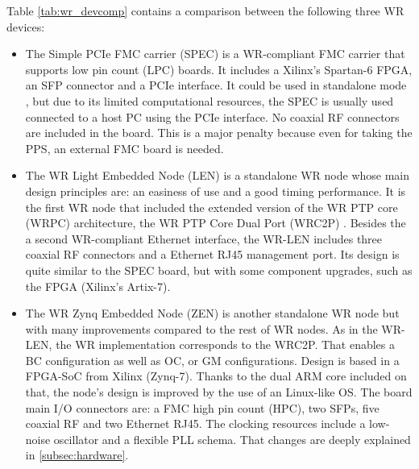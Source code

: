 Table \ref{tab:wr_devcomp} contains a comparison between the following three WR 
devices: 
\begin{itemize}
	\item The Simple PCIe FMC carrier (SPEC) \cite{ohwr:spec} is a WR-compliant 
	FMC carrier that supports low pin count (LPC) boards. It includes a 
	Xilinx's Spartan-6 FPGA, an SFP connector and a PCIe interface. It could be 
	used in standalone mode \cite{migueljl-paper-wr-spec}, but due to its 
	limited computational resources, the SPEC is usually used connected to a 
	host PC using the PCIe interface. 
	No coaxial RF connectors are included in the board. This is a major penalty 
	because even for taking the PPS, an external FMC board is needed.
	
	\item The WR Light Embedded Node (LEN) \cite{sevensols:wr_len} is a 
	standalone WR node whose main design principles are: an easiness of use and 
	a good timing performance. It is the first WR node that included the 
	extended version of the WR PTP core (WRPC) architecture, the WR PTP Core 
	Dual Port (WRC2P) \cite{torres2016scalability}. Besides the a second 
	WR-compliant 
	Ethernet interface, the WR-LEN includes three coaxial RF connectors and a 
	Ethernet RJ45 management port. Its design is quite similar to the SPEC 
	board, but with some component upgrades, such as the FPGA (Xilinx's 
	Artix-7).
	
	\item The WR Zynq Embedded Node (ZEN) \cite{sevensols:wr_zen} is another 
	standalone WR node but with many improvements compared to the rest of WR 
	nodes. As in the WR-LEN, the WR implementation corresponds to the WRC2P. 
	That enables a BC configuration as well as OC, or GM configurations. Design 
	is based in a FPGA-SoC from Xilinx (Zynq-7). Thanks to the dual ARM core 
	included on that, the node's design is improved by the use of an Linux-like 
	OS. The board main I/O connectors are: a FMC high pin count (HPC), two 
	SFPs, five coaxial RF and two Ethernet RJ45. The clocking resources include 
	a low-noise oscillator and a flexible PLL schema. That changes are deeply 
	explained in \ref{subsec:hardware}.
\end{itemize}

